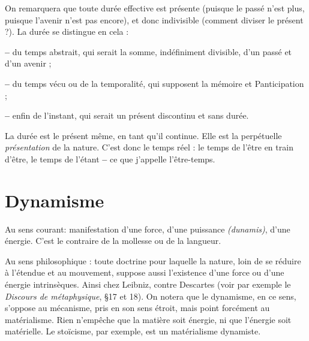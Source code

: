 On remarquera que toute durée effective est présente (puisque le passé n’est
plus, puisque l’avenir n’est pas encore), et donc indivisible (comment diviser le
présent ?). La durée se distingue en cela :

{\bf --} du temps abstrait, qui serait la somme, indéfiniment divisible, d’un passé
et d’un avenir ;

{\bf --} du temps vécu ou de la temporalité, qui supposent la mémoire et
Panticipation ;

{\bf --} enfin de l'instant, qui serait un présent discontinu et sans durée.

La durée est le présent même, en tant qu’il continue. Elle est la perpétuelle
{\it présentation} de la nature. C’est donc le temps réel : le temps de l’être en train
d’être, le temps de l’étant {\bf --} ce que j'appelle l’être-temps.

\section{Dynamisme}
Au sens courant: manifestation d’une force, d’une puissance
{\it (dunamis)}, d’une énergie. C’est le contraire de la mollesse
ou de la langueur.

Au sens philosophique : toute doctrine pour laquelle la nature, loin de se
réduire à l’étendue et au mouvement, suppose aussi l’existence d’une force ou
d’une énergie intrinsèques. Ainsi chez Leibniz, contre Descartes (voir par
exemple le {\it Discours de métaphysique}, \S 17 et 18). On notera que le dynamisme,
en ce sens, s'oppose au mécanisme, pris en son sens étroit, mais point forcément
au matérialisme. Rien n'empêche que la matière soit énergie, ni que
l'énergie soit matérielle. Le stoïcisme, par exemple, est un matérialisme dynamiste.

